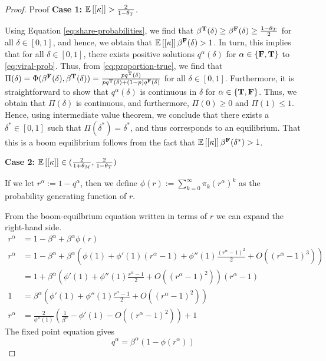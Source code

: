 \begin{proof}{Proof}
\textbf{Case 1:} $\mathbb{E}\left[ [\kappa]\right] > \frac{2}{1-\theta_T}$. 

Using Equation \eqref{eq:share-probabilities}, we find that $\beta^{\mathbf{T}}(\delta) \geq \beta^{\mathbf{F}}(\delta) \geq \frac{1-\theta_T}{2}$ for all $\delta \in [0,1]$, and hence, we obtain that $\mathbb{E}\left[ [\kappa]\right] \beta^{\mathbf{F}}(\delta) > 1$. In turn, this implies that for all $\delta \in [0,1]$, there exists positive solutions $q^\alpha(\delta)$ for $\alpha \in \{ \mathbf{F}, \mathbf{T}\}$ to \eqref{eq:viral-prob}. Thus, from \eqref{eq:proportion-true}, we find that $\Pi(\delta) = \Phi(\beta^{\mathbf{F}}(\delta), \beta^{\mathbf{T}}(\delta)) = \frac{p q^{\mathbf{T}}(\delta) }{p q^{\mathbf{T}}(\delta) + (1-p)q^{\mathbf{F}}(\delta)}$ for all $\delta \in [0,1]$. Furthermore, it is straightforward to show that $q^\alpha(\delta)$ is continuous in $\delta$ for $\alpha \in \{\mathbf{T}, \mathbf{F}\}$. Thus, we obtain that $\Pi(\delta)$ is continuous, and furthermore, $\Pi(0) \geq 0$ and $\Pi(1) \leq 1$. Hence, using intermediate value theorem, we conclude that there exists a $\delta^* \in [0,1]$ such that $\Pi(\delta^*) = \delta^*$, and thus corresponds to an equilibrium. That this is a boom equilibrium follows from the fact that $\mathbb{E}\left[ [\kappa]\right] \beta^{\mathbf{F}}(\delta^*) >1$.

\textbf{Case 2:} $\mathbb{E}\left[ [\kappa]\right] \in (\frac{2}{1+\theta_M}, \frac{2}{1-\theta_T})$ 

If we let $r^\alpha := 1-q^\alpha$, then we define $\phi(r) := \sum_{k=0}^\infty \pi_k (r^\alpha)^k $ as the probability generating function of $r$.

From the boom-equilbrium equation written in terms of $r$ we can expand the right-hand side. 
\begin{align*}
    r^\alpha &= 1-\beta^\alpha + \beta^\alpha \phi(r) \\
    r^\alpha &=  1 - \beta^\alpha + \beta^\alpha\left( \phi(1) + \phi'(1) (r^\alpha-1) +\phi''(1) \frac{(r^\alpha-1)^2}{2} + O((r^\alpha-1)^3) \right)  \\
    &= 1 + \beta^\alpha \left( \phi'(1) + \phi''(1) \frac{r^\alpha-1}{2} + O((r^\alpha-1)^2) \right) (r^\alpha-1)\\
    1 &= \beta^\alpha \left( \phi'(1) + \phi''(1) \frac{r^\alpha-1}{2} + O((r^\alpha-1)^2) \right) \\
    r^\alpha &= \frac{2}{\phi''(1)} \left(\frac{1}{\beta^\alpha} - \phi'(1) - O((r^\alpha -1)^2) \right) + 1
\end{align*}
The fixed point equation gives
\begin{equation}
    q^\alpha = \beta^\alpha \left( 1 - \phi(r^\alpha) \right)
\end{equation}


\end{proof}
